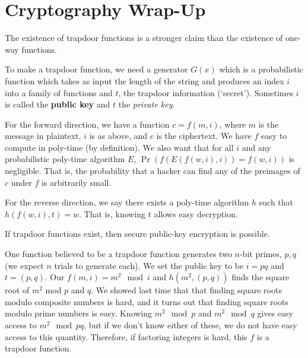 




\section*{Cryptography Wrap-Up}


The existence of trapdoor functions is a stronger claim than the existence of one-way functions.

To make a trapdoor function, we need a generator $G(x)$ which is a probabilistic function which takes as input the length of the string and produces an index $i$ into a family of functions and $t$, the trapdoor information (`secret'). Sometimes $i$ is called the \textbf{public key} and $t$ the \textit{private key}.

For the forward direction, we have a function $c=f(m,i)$, where $m$ is the message in plaintext, $i$ is as above, and $c$ is the ciphertext.  We have $f$ easy to compute in poly-time (by definition).  We also want that for all $i$ and any probabilistic poly-time algorithm $E$, $\Pr(f(E(f(w,i),i))=f(w,i))$ is negligible.  That is, the probability that a hacker can find any of the preimages of $c$ under $f$ is arbitrarily small.

For the reverse direction, we say there exists a poly-time algorithm $h$ such that $h(f(w,i),t)=w$.  That is, knowing $t$ allows easy decryption.

If trapdoor functions exist, then secure public-key encryption is possible.

One function believed to be a trapdoor function generates two $n$-bit primes, $p,q$ (we expect $n$ trials to generate each).  We set the public key to be $i=pq$ and $t=(p,q)$.  Our $f(m,i)=m^2\mod  i$ and $h(m^2,(p,q))$ finds the square root of $m^2$ mod $p$ and $q$.  We showed last time that that finding square roots modulo composite numbers is hard, and it turns out that finding square roots modulo prime numbers is easy.  Knowing $m^2\mod p$ and $m^2\mod q$ gives easy access to $m^2\mod pq$, but if we don't know either of these, we do not have easy access to this quantity.  Therefore, if factoring integers is hard, this $f$ is a trapdoor function.

